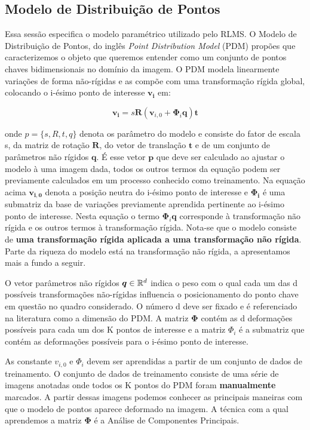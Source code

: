 {\subsection{Modelo de Distribuição de Pontos}

Essa sessão especifica o modelo paramétrico utilizado pelo RLMS. O Modelo de Distribuição de Pontos, do inglês  \textit{Point Distribution Model} (PDM) propões que caracterizemos o objeto que queremos entender como um conjunto de pontos chaves
bidimensionais no domínio da imagem. O PDM modela linearmente variações de forma não-rígidas e as compõe com uma transformação rígida global, colocando o i-ésimo ponto de interesse
$\bm{v_i}$ em:

\begin{equation}
 \bm{v_i} = s \bm{R} ( \bm{v}_{i,0} + \bm{\Phi}_i \bm{q}) \bm{t}
\label{eq:PDM-equation}
\end{equation}
 
onde $p=\{s,R,t,q\}$ denota os parâmetro do modelo e consiste do fator de
escala s, da matriz de rotação $\bm{R}$, do vetor de translação $\bm{t}$ e de um
conjunto de parâmetros não rígidos $\bm{q}$. É esse vetor $\bm{p}$ que deve ser
calculado ao ajustar o modelo à uma imagem dada, todos os outros termos da
equação podem ser previamente calculados em um processo conhecido como
treinamento.  Na equação acima $\bm{v_{i,0}}$ denota a posição neutra do i-ésimo ponto de interesse e $\bm{\Phi_i}$ é uma submatriz da base de variações
previamente aprendida pertinente ao i-ésimo ponto de interesse.  Nesta equação o
termo $\bm{\Phi}_i \bm{q}$ corresponde à transformação não rígida e os outros
termos à transformação rígida. Nota-se que o modelo consiste de \textbf{uma
transformação rígida aplicada a uma transformação não rígida}. Parte da riqueza
do modelo está na transformação não rígida, a apresentamos mais a fundo a
seguir.

O vetor parâmetros não rígidos $\bm{q} \in \mathbb{R} ^d$ indica o peso com o qual
cada um das d possíveis transformações não-rígidas influencia o posicionamento
do ponto chave em questão no quadro considerado. O número d deve ser fixado e é
referenciado na literatura como a dimensão do PDM. A matriz $\bm{\Phi}$ contém as d
deformações possíveis para cada um dos K pontos de interesse e a matriz $\Phi_i$
é a submatriz que contém as deformações possíveis para o i-ésimo ponto de
interesse.

As constante $v_{i,0}$ e $\Phi_i$ devem ser aprendidas a partir de um conjunto
de dados de treinamento. O conjunto de dados de treinamento consiste de uma
série de imagens anotadas onde todos os K pontos do PDM foram
\textbf{manualmente} marcados. A partir dessas imagens podemos conhecer as
principais maneiras com que o modelo de pontos aparece deformado na imagem. A
técnica com a qual aprendemos a matriz $\bm{\Phi}$ é a Análise de Componentes
Principais.

}
